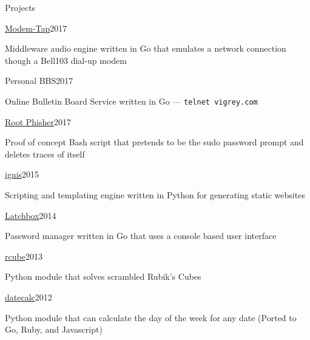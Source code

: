 \documentclass{resume} %
\begin{document}
\begin{rSection}{Projects}
\begin{rSubsection}{\href{https://github.com/ViGrey/modem-tap}{Modem-Tap}}{2017}{}{}
\item Middleware audio engine written in Go that emulates a network connection though a Bell103 dial-up modem
\end{rSubsection}

\begin{rSubsection}{Personal BBS}{2017}{}{}
\item Online Bulletin Board Service written in Go --- \texttt{telnet vigrey.com}
\end{rSubsection}


\begin{rSubsection}{\href{https://gist.github.com/ViGrey/213cfd61668c08c09b76fdc30781ac64}{Root Phisher}}{2017}{}{}
\item Proof of concept Bash script that pretends to be the sudo password prompt and deletes traces of itself
\end{rSubsection}

\begin{rSubsection}{\href{https://github.com/ViGrey/ignis}{ignis}}{2015}{}{}
\item Scripting and templating engine written in Python for generating static websites
\end{rSubsection}

\begin{rSubsection}{\href{https://github.com/ViGrey/latchbox}{Latchbox}}{2014}{}{}
\item Password manager written in Go that uses a console based user interface
\end{rSubsection}

\begin{rSubsection}{\href{https://github.com/ViGrey/rcube}{rcube}}{2013}{}{}
\item Python module that solves scrambled Rubik's Cubes
\end{rSubsection}

\begin{rSubsection}{\href{https://github.com/ViGrey/datecalc}{datecalc}}{2012}{}{}
\item Python module that can calculate the day of the week for any date (Ported to Go, Ruby, and Javascript)
\end{rSubsection}


\end{rSection}


\end{document}
